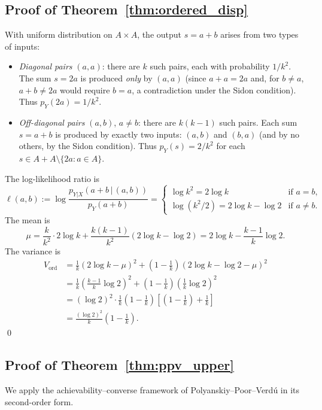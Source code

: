 \documentclass[11pt]{amsart}
\theoremstyle{plain}
\theoremstyle{definition}
\theoremstyle{remark}
\begin{document}
\subsection{Proof of Theorem~\ref{thm:ordered_disp}}

With uniform distribution on $A \times A$, the output $s = a+b$ arises
from two types of inputs:
\begin{itemize}
  \item \emph{Diagonal pairs} $(a,a)$: there are $k$ such pairs, each with
    probability $1/k^2$.  The sum $s = 2a$ is produced \emph{only} by
    $(a,a)$ (since $a+a = 2a$ and, for $b \ne a$, $a+b \ne 2a$ would
    require $b = a$, a contradiction under the Sidon condition).  Thus
    $p_Y(2a) = 1/k^2$.
  \item \emph{Off-diagonal pairs} $(a,b)$, $a \ne b$: there are $k(k-1)$
    such pairs.  Each sum $s = a+b$ is produced by exactly two inputs:
    $(a,b)$ and $(b,a)$ (and by no others, by the Sidon condition).  Thus
    $p_Y(s) = 2/k^2$ for each $s \in A+A \setminus \{2a : a \in A\}$.
\end{itemize}
The log-likelihood ratio is
\[
  \ell(a,b) := \log \frac{p_{Y|X}(a+b\,|\,(a,b))}{p_Y(a+b)}
  = \begin{cases}
      \log k^2 = 2\log k & \text{if } a = b, \\
      \log(k^2/2) = 2\log k - \log 2 & \text{if } a \ne b.
    \end{cases}
\]
The mean is
\[
  \mu = \frac{k}{k^2}\cdot 2\log k
        + \frac{k(k-1)}{k^2}(2\log k - \log 2)
  = 2\log k - \frac{k-1}{k}\log 2.
\]
The variance is
\begin{align*}
  V_{\mathrm{ord}}
  &= \frac{1}{k}(2\log k - \mu)^2
     + \left(1-\frac{1}{k}\right)(2\log k - \log 2 - \mu)^2 \\
  &= \frac{1}{k}\left(\frac{k-1}{k}\log 2\right)^2
     + \left(1-\frac{1}{k}\right)\left(\frac{1}{k}\log 2\right)^2 \\
  &= (\log 2)^2 \cdot \frac{1}{k}\left(1-\frac{1}{k}\right)
     \left[\left(1-\frac{1}{k}\right) + \frac{1}{k}\right] \\
  &= \frac{(\log 2)^2}{k}\left(1-\frac{1}{k}\right).
\end{align*}
\qed

\subsection{Proof of Theorem~\ref{thm:ppv_upper}}

We apply the achievability--converse framework of Polyanskiy--Poor--Verd\'u
\cite{ppv_2010} in its second-order form.
\end{document}

